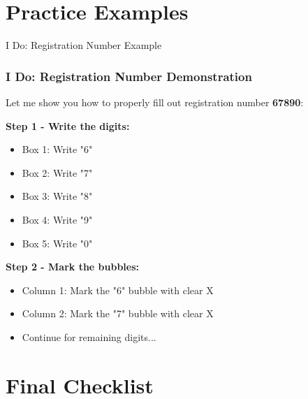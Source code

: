 \documentclass{beamer}
\begin{document}
\section{Practice Examples}

\begin{frame}{I Do: Registration Number Example}
\frametitle{I Do: Registration Number Demonstration}
Let me show you how to properly fill out registration number \textbf{67890}:

\textbf{Step 1 - Write the digits:}
\begin{itemize}
\item Box 1: Write "6"
\item Box 2: Write "7" 
\item Box 3: Write "8"
\item Box 4: Write "9"
\item Box 5: Write "0"
\end{itemize}

\textbf{Step 2 - Mark the bubbles:}
\begin{itemize}
\item Column 1: Mark the "6" bubble with clear X
\item Column 2: Mark the "7" bubble with clear X
\item Continue for remaining digits...
\end{itemize}

\end{frame}


\section{Final Checklist}
\end{document}
